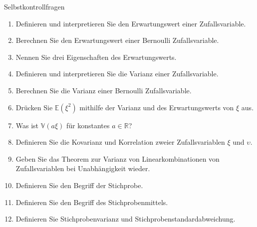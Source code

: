 \documentclass[
  8pt,
  ignorenonframetext,
]{beamer}
\newcommand{\ups}{\upsilon}
\begin{document}
\begin{frame}{Selbstkontrollfragen}
\protect\hypertarget{selbstkontrollfragen}{}
\footnotesize
{}
\begin{enumerate}
\item Definieren und interpretieren Sie den Erwartungswert einer Zufallsvariable.
\item Berechnen Sie den Erwartungswert einer Bernoulli Zufallsvariable.
\item Nennen Sie drei Eigenschaften des Erwartungswerts.
\item Definieren und interpretieren Sie die Varianz einer Zufallsvariable.
\item Berechnen Sie die Varianz einer Bernoulli Zufallsvariable.
\item Drücken Sie $\mathbb{E}(\xi^2)$ mithilfe der Varianz und des Erwartungswerts von $\xi$ aus.
\item Was ist $\mathbb{V}(a\xi)$ für konstantes $a \in \mathbb{R}$?
\item Definieren Sie die Kovarianz und Korrelation zweier Zufallsvariablen $\xi$ und $\ups$.
\item Geben Sie das Theorem zur Varianz von Linearkombinationen von Zufallsvariablen bei Unabhängigkeit wieder.
\item Definieren Sie den Begriff der Stichprobe.
\item Definieren Sie den Begriff des Stichprobenmittels.
\item Definieren Sie Stichprobenvarianz und Stichprobenstandardabweichung.
\end{enumerate}
\end{frame}
\end{document}
